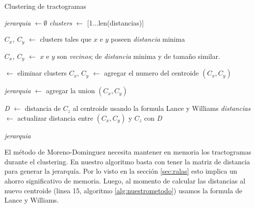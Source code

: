 \begin{algorithm}[h!]
\caption{Clustering de tractogramas}\label{alg:nuestrometodo}
\begin{algorithmic}[1]

                      
    \State \emph{jerarquia} $\gets \emptyset$
    \State \emph{clusters} $\gets$ [1$\dots$len(distancias)]                  
                      


        \State \emph{$C_x$, $C_y$} $\gets$ clusters tales que $x$ e $y$ poseen \emph{distancia} minima      
            
    \Else{}

        \State \emph{$C_x$, $C_y$} $\gets$ $x$ e $y$ son \emph{vecinos}; 
                                   de \emph{distancia} minima y de tama\~no similar.

    \EndIf
    
     $\gets$ eliminar clusters $C_x$, $C_y$
     $\gets$ agregar el numero del centroide $(C_x,C_y)$ 
                          
    \State \emph{jerarquia} $\gets$ agregar la union $(C_x,C_y)$
    
        \State \emph{D} $\gets$ distancia de $C_z$ al centroide usando la formula Lance y Williams
        \State \emph{distancias} $\gets$ actualizar distancia entre $(C_x,C_y)$ y $C_z$ con \emph{D}
    \EndFor            
    
\EndFor


\State \Return \emph{jerarquia} 
 
\EndProcedure 

\end{algorithmic}
\end{algorithm}

El m\'etodo de Moreno-Dominguez necesita mantener en memoria los
tractogramas durante el clustering. En nuestro algoritmo basta con tener
la matriz de distancia para generar la jerarqu\'ia. Por lo visto en la
secci\'on \ref{sec:ralas} esto implica un ahorro significativo de memoria.
Luego, al momento de calcular las distancias al nuevo centroide 
(linea 15, algoritmo \ref{alg:nuestrometodo}) usamos la formula de Lance y
Williams. \\

